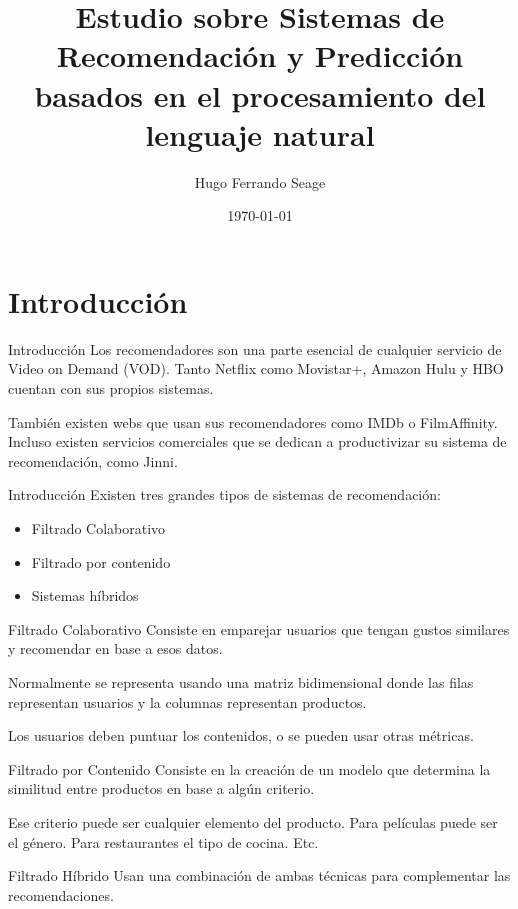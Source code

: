 \documentclass{beamer}
\title{Estudio sobre Sistemas de Recomendación y Predicción basados en el procesamiento del lenguaje natural}
\date{\today}
\author{Hugo Ferrando Seage}
\institute{Universidad Europea de Madrid\\Escuela de Arquitectura, Ingeniería y Diseño}
\begin{document}
  \maketitle

  \section{Introducción}
  \begin{frame}{Introducción}
      Los recomendadores son una parte esencial de cualquier servicio de Video on Demand (VOD). Tanto Netflix como Movistar+, Amazon Hulu y HBO cuentan con sus propios sistemas.

      También existen webs que usan sus recomendadores como IMDb o FilmAffinity. Incluso existen servicios comerciales que se dedican a productivizar su sistema de recomendación, como Jinni.
  \end{frame}

  \begin{frame}{Introducción}
      Existen tres grandes tipos de sistemas de recomendación:
      \begin{itemize}
          \item Filtrado Colaborativo
          \item Filtrado por contenido
          \item Sistemas híbridos
      \end{itemize}
  \end{frame}

  \begin{frame}{Filtrado Colaborativo}
      Consiste en emparejar usuarios que tengan gustos similares y recomendar en base a esos datos.

      Normalmente se representa usando una matriz bidimensional donde las filas representan usuarios y la columnas representan productos.

      Los usuarios deben puntuar los contenidos, o se pueden usar otras métricas.
  \end{frame}

  \begin{frame}{Filtrado por Contenido}
      Consiste en la creación de un modelo que determina la similitud entre productos en base a algún criterio.

      Ese criterio puede ser cualquier elemento del producto. Para películas puede ser el género. Para restaurantes el tipo de cocina. Etc.
  \end{frame}

  \begin{frame}{Filtrado Híbrido}
      Usan una combinación de ambas técnicas para complementar las recomendaciones.
  \end{frame}
\end{document}
